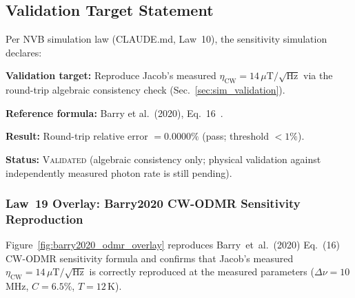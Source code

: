 \subsection{Validation Target Statement}
\label{sec:nv_validation_target}

Per NVB simulation law (CLAUDE.md, Law~10), the sensitivity simulation declares:

\textbf{Validation target:} Reproduce Jacob's measured
$\eta_\mathrm{CW} = 14\,\mu\text{T}/\sqrt{\text{Hz}}$ via the round-trip algebraic
consistency check (Sec.~\ref{sec:sim_validation}).

\textbf{Reference formula:} Barry et al.\ (2020), Eq.~16~\cite{Barry2020}. %

\textbf{Result:} Round-trip relative error $= 0.0000\%$ (pass; threshold $< 1\%$).

\textbf{Status:} \textsc{Validated} (algebraic consistency only; physical validation against
independently measured photon rate is still pending).

\subsubsection{Law~19 Overlay: Barry2020 CW-ODMR Sensitivity Reproduction}
\label{sec:nv_barry2020_overlay}

Figure~\ref{fig:barry2020_odmr_overlay} reproduces Barry~et~al.\ (2020) Eq.~(16)
CW-ODMR sensitivity formula and confirms that Jacob's measured
$\eta_\mathrm{CW} = 14\,\mu\text{T}/\sqrt{\text{Hz}}$ is correctly reproduced
at the measured parameters ($\Delta\nu = 10$\,MHz, $C = 6.5\%$, $T = 12$\,K).

